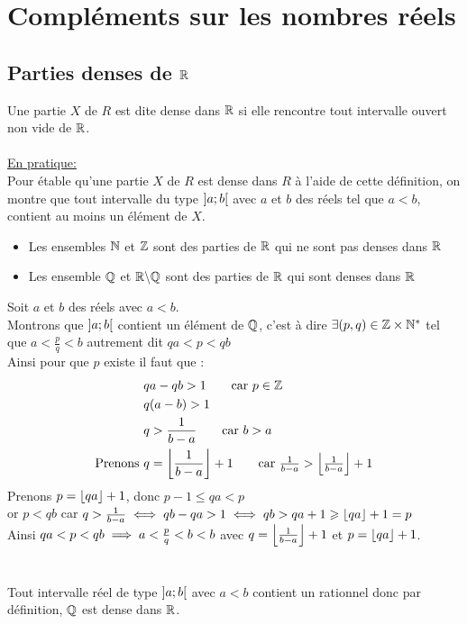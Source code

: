 \chapter{Compléments sur les nombres réels}

\minitoc
\section{Parties denses de \(\mathbb{R}\)}

\begin{defprop}[Généralité]
    Une partie \(X\) de \(R\) est dite dense dans \(\mathbb{R}\) si elle rencontre tout intervalle ouvert non vide de \(\mathbb{R}\). \\
    ~\\
    \underline{En pratique:} \\
    Pour étable qu'une partie \(X\) de \(R\) est dense dans \(R\) à l'aide de cette définition, on montre que tout intervalle du type \(\left]a;b\right[\) avec \(a\) et \(b\) des réels tel que \(a<b\), contient au moins un élément de \(X\).
\end{defprop}

\begin{ex}
\begin{itemize}
    \item Les ensembles \(\mathbb{N}\) et \(\mathbb{Z}\) sont des parties de \(\mathbb{R}\) qui ne sont pas denses dans \(\mathbb{R}\)
    \item Les ensemble \(\mathbb{Q}\) et \(\mathbb{R}\backslash\mathbb{Q}\) sont des parties de \(\mathbb{R}\) qui sont denses dans \(\mathbb{R}\)
\end{itemize}
\end{ex}

\begin{dem}
    Soit \(a\) et \(b\) des réels avec \(a<b\).\\
    Montrons que \(\left]a;b\right[\) contient un élément de \(\mathbb{Q}\), c'est à dire \(\exists (p,q) \in \mathbb{Z}\times\mathbb{N}^*\) tel que \(a<\frac{p}{q}<b\)
    autrement dit \(qa<p<qb\) \\
    Ainsi pour que \(p\) existe il faut que : \\
    \begin{align*}
    &qa - qb > 1       \tag*{car \( p \in \Z \)} \\
    &q(a - b) > 1      \\
    &q > \frac{1}{b-a} \tag*{car \( b > a \)}\\
    \text{Prenons } &q=\floor{\frac{1}{b-a}} +1 \tag*{car \(\frac{1}{b-a}>\floor{\frac{1}{b-a}}+1\)}  
\end{align*}
Prenons \(p=\left\lfloor qa\right\rfloor+1\), donc  \( p-1 \leq qa<p\) \\
or \(p<qb\) car \(q>\frac{1}{b-a} \iff qb-qa>1 \iff qb>qa+1\geqslant \left\lfloor qa\right\rfloor+1=p\) \\
Ainsi \(qa<p<qb\implies a<\frac{p}{q}<b<b\) avec \(q=\left\lfloor\frac{1}{b-a}\right\rfloor +1\) et \(p=\left\lfloor qa\right\rfloor+1\).
\\\\
\conclusion \\
Tout intervalle réel de type \(\left]a;b\right[\) avec \(a<b\) contient un rationnel donc par définition, \(\mathbb{Q}\) est dense dans \(\mathbb{R}\).
\end{dem}

